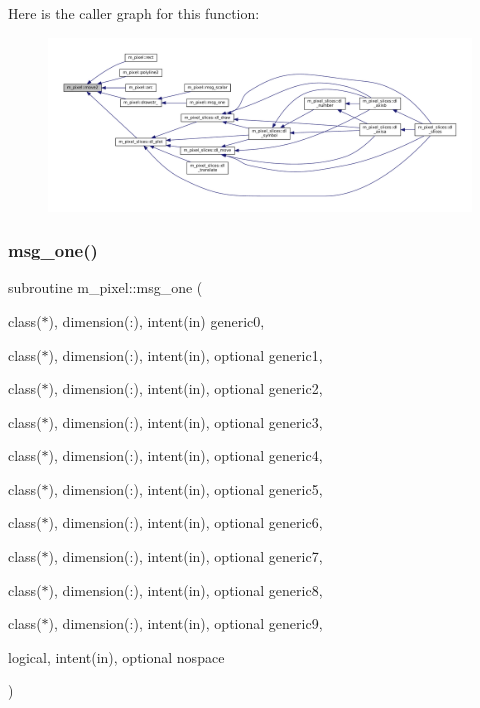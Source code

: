 Here is the caller graph for this function\+:
\nopagebreak
\begin{figure}[H]
\begin{center}
\leavevmode
\includegraphics[width=350pt]{namespacem__pixel_ab5d4dc474ff84dc0f3f35f4a395979e0_icgraph}
\end{center}
\end{figure}
\mbox{\label{namespacem__pixel_a8c097c521deafffc765bd3f35eca423c}} 
\subsubsection{\texorpdfstring{msg\+\_\+one()}{msg\_one()}}
{\footnotesize\ttfamily subroutine m\+\_\+pixel\+::msg\+\_\+one (\begin{DoxyParamCaption}\item[{class($\ast$), dimension(\+:), intent(in)}]{generic0,  }\item[{class($\ast$), dimension(\+:), intent(in), optional}]{generic1,  }\item[{class($\ast$), dimension(\+:), intent(in), optional}]{generic2,  }\item[{class($\ast$), dimension(\+:), intent(in), optional}]{generic3,  }\item[{class($\ast$), dimension(\+:), intent(in), optional}]{generic4,  }\item[{class($\ast$), dimension(\+:), intent(in), optional}]{generic5,  }\item[{class($\ast$), dimension(\+:), intent(in), optional}]{generic6,  }\item[{class($\ast$), dimension(\+:), intent(in), optional}]{generic7,  }\item[{class($\ast$), dimension(\+:), intent(in), optional}]{generic8,  }\item[{class($\ast$), dimension(\+:), intent(in), optional}]{generic9,  }\item[{logical, intent(in), optional}]{nospace }\end{DoxyParamCaption})\hspace{0.3cm}{\ttfamily [private]}}



